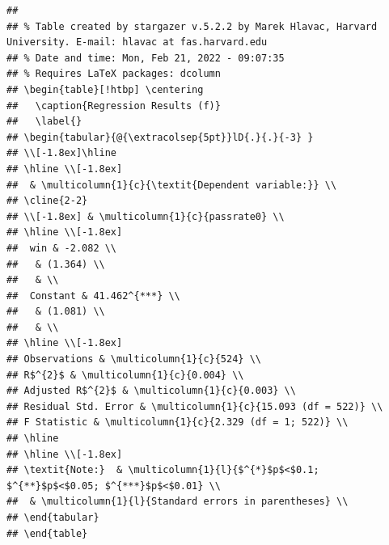 \documentclass[
  12pt,
  landscape]{article}
\begin{document}
\begin{verbatim}
## 
## % Table created by stargazer v.5.2.2 by Marek Hlavac, Harvard University. E-mail: hlavac at fas.harvard.edu
## % Date and time: Mon, Feb 21, 2022 - 09:07:35
## % Requires LaTeX packages: dcolumn 
## \begin{table}[!htbp] \centering 
##   \caption{Regression Results (f)} 
##   \label{} 
## \begin{tabular}{@{\extracolsep{5pt}}lD{.}{.}{-3} } 
## \\[-1.8ex]\hline 
## \hline \\[-1.8ex] 
##  & \multicolumn{1}{c}{\textit{Dependent variable:}} \\ 
## \cline{2-2} 
## \\[-1.8ex] & \multicolumn{1}{c}{passrate0} \\ 
## \hline \\[-1.8ex] 
##  win & -2.082 \\ 
##   & (1.364) \\ 
##   & \\ 
##  Constant & 41.462^{***} \\ 
##   & (1.081) \\ 
##   & \\ 
## \hline \\[-1.8ex] 
## Observations & \multicolumn{1}{c}{524} \\ 
## R$^{2}$ & \multicolumn{1}{c}{0.004} \\ 
## Adjusted R$^{2}$ & \multicolumn{1}{c}{0.003} \\ 
## Residual Std. Error & \multicolumn{1}{c}{15.093 (df = 522)} \\ 
## F Statistic & \multicolumn{1}{c}{2.329 (df = 1; 522)} \\ 
## \hline 
## \hline \\[-1.8ex] 
## \textit{Note:}  & \multicolumn{1}{l}{$^{*}$p$<$0.1; $^{**}$p$<$0.05; $^{***}$p$<$0.01} \\ 
##  & \multicolumn{1}{l}{Standard errors in parentheses} \\ 
## \end{tabular} 
## \end{table}
\end{verbatim}
\end{document}
